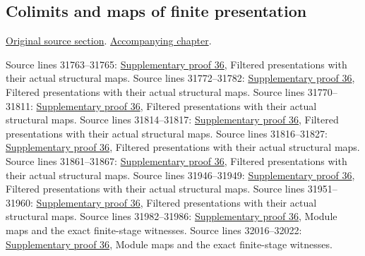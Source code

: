 \subsection{Colimits and maps of finite presentation}
\hypertarget{algebra-source-section-colimits-flat}{}
\noindent\href{https://github.com/stacks/stacks-project/blob/a04446e57ec1fbc252a871afcec7752fb2807b14/algebra.tex\#L31759}{Original source section}. \href{algebra.pdf\#nameddest=section-colimits-flat}{Accompanying chapter}.

\begin{AlgebraSourceRoutes}
 Source lines 31763--31765: \hyperlink{algebra_colimit_categories_notes_20260928}{Supplementary proof 36}, Filtered presentations with their actual structural maps.
 Source lines 31772--31782: \hyperlink{algebra_colimit_categories_notes_20260928}{Supplementary proof 36}, Filtered presentations with their actual structural maps.
 Source lines 31770--31811: \hyperlink{algebra_colimit_categories_notes_20260928}{Supplementary proof 36}, Filtered presentations with their actual structural maps.
 Source lines 31814--31817: \hyperlink{algebra_colimit_categories_notes_20260928}{Supplementary proof 36}, Filtered presentations with their actual structural maps.
 Source lines 31816--31827: \hyperlink{algebra_colimit_categories_notes_20260928}{Supplementary proof 36}, Filtered presentations with their actual structural maps.
 Source lines 31861--31867: \hyperlink{algebra_colimit_categories_notes_20260928}{Supplementary proof 36}, Filtered presentations with their actual structural maps.
 Source lines 31946--31949: \hyperlink{algebra_colimit_categories_notes_20260928}{Supplementary proof 36}, Filtered presentations with their actual structural maps.
 Source lines 31951--31960: \hyperlink{algebra_colimit_categories_notes_20260928}{Supplementary proof 36}, Filtered presentations with their actual structural maps.
 Source lines 31982--31986: \hyperlink{algebra_colimit_categories_notes_20260928}{Supplementary proof 36}, Module maps and the exact finite-stage witnesses.
 Source lines 32016--32022: \hyperlink{algebra_colimit_categories_notes_20260928}{Supplementary proof 36}, Module maps and the exact finite-stage witnesses.

\end{AlgebraSourceRoutes}
